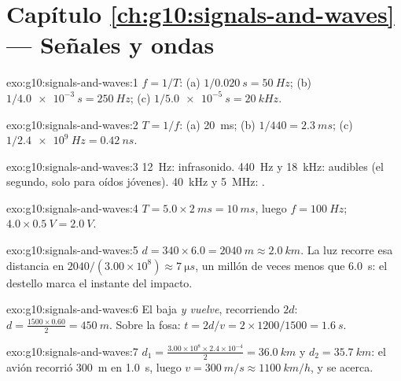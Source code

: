 \section*{Capítulo \ref{ch:g10:signals-and-waves} --- Señales y ondas}

\begin{solution}{exo:g10:signals-and-waves:1}
$f = 1/T$: (a) $1/\qty{0.020}{s} = \qty{50}{Hz}$;
(b) $1/\qty{4.0e-3}{s} = \qty{250}{Hz}$;
(c) $1/\qty{5.0e-5}{s} = \qty{20}{kHz}$.
\end{solution}

\begin{solution}{exo:g10:signals-and-waves:2}
$T = 1/f$: (a) \qty{20}{ms}; (b) $1/440 = \qty{2.3}{ms}$;
(c) $1/\qty{2.4e9}{Hz} = \qty{0.42}{ns}$.
\end{solution}

\begin{solution}{exo:g10:signals-and-waves:3}
\qty{12}{Hz}: infrasonido. \qty{440}{Hz} y \qty{18}{kHz}: audibles (el
segundo, solo para oídos jóvenes). \qty{40}{kHz} y \qty{5}{MHz}:
.
\end{solution}

\begin{solution}{exo:g10:signals-and-waves:4}
$T = 5.0 \times \qty{2}{ms} = \qty{10}{ms}$, luego $f = \qty{100}{Hz}$;
 $4.0 \times \qty{0.5}{V} = \qty{2.0}{V}$.
\end{solution}

\begin{solution}{exo:g10:signals-and-waves:5}
$d = 340 \times 6.0 = \qty{2040}{m} \approx \qty{2.0}{km}$. La luz
recorre esa distancia en
$2040/(3.00\times10^{8}) \approx \qty{7}{\micro s}$, un millón de veces
menos que \qty{6.0}{s}: el destello marca el instante del impacto.
\end{solution}

\begin{solution}{exo:g10:signals-and-waves:6}
El  baja \emph{y vuelve}, recorriendo $2d$:
$d = \frac{1500 \times 0.60}{2} = \qty{450}{m}$. Sobre la fosa:
$t = 2d/v = 2 \times 1200/1500 = \qty{1.6}{s}$.
\end{solution}

\begin{solution}{exo:g10:signals-and-waves:7}
$d_1 = \frac{3.00\times10^{8} \times 2.4\times10^{-4}}{2} =
\qty{36.0}{km}$ y $d_2 = \qty{35.7}{km}$: el avión recorrió
\qty{300}{m} en \qty{1.0}{s}, luego
$v = \qty{300}{m/s} \approx \qty{1100}{km/h}$, y se acerca.
\end{solution}

